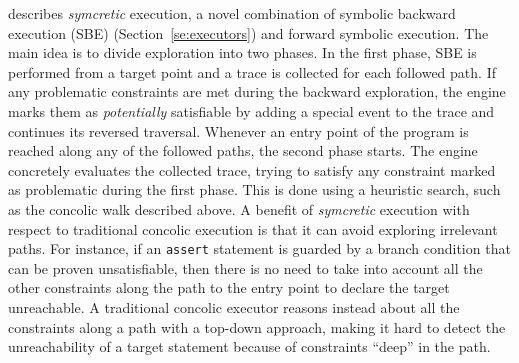 {%
\cite{DA-ASE14} describes {\em symcretic} execution, a novel combination of symbolic backward execution (SBE) (Section~\ref{se:executors}) and forward symbolic execution. The main idea is to divide exploration into two phases. In the first phase, SBE is performed from a target point and a trace is collected for each followed path. If any problematic constraints are met during the backward exploration, the engine marks them as {\em potentially} satisfiable by adding a special event to the trace and continues its reversed traversal. Whenever an entry point of the program is reached along any of the followed paths, the second phase starts. The engine concretely evaluates the collected trace, trying to satisfy any constraint marked as problematic during the first phase. This is done using a heuristic search, such as the concolic walk described above. A benefit of {\em symcretic} execution with respect to traditional concolic execution is that it can avoid exploring irrelevant paths. For instance, if an {\tt assert} statement is guarded by a branch condition that can be proven unsatisfiable, then there is no need to take into account all the other constraints along the path to the entry point to declare the target unreachable. A traditional concolic executor reasons instead about all the constraints along a path with a top-down approach, making it hard to detect the unreachability of a target statement because of constraints ``deep'' in the path.
}


